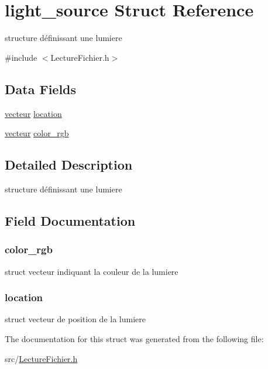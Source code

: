 \hypertarget{structlight__source}{
\section{light\_\-source Struct Reference}
\label{structlight__source}
}


structure définissant une lumiere  




{\ttfamily \#include $<$LectureFichier.h$>$}

\subsection*{Data Fields}
\begin{DoxyCompactItemize}
\item 
\hyperlink{structvecteur}{vecteur} \hyperlink{structlight__source_ae655d799d0a983ee8cf5fc840953c404}{location}
\item 
\hyperlink{structvecteur}{vecteur} \hyperlink{structlight__source_a9efa06c385522a41b30ea3767811650a}{color\_\-rgb}
\end{DoxyCompactItemize}


\subsection{Detailed Description}
structure définissant une lumiere 

\subsection{Field Documentation}
\hypertarget{structlight__source_a9efa06c385522a41b30ea3767811650a}{
\subsubsection[{color\_\-rgb}]{ {\bf color\_\-rgb}}}
\label{structlight__source_a9efa06c385522a41b30ea3767811650a}
struct vecteur indiquant la couleur de la lumiere \hypertarget{structlight__source_ae655d799d0a983ee8cf5fc840953c404}{
\subsubsection[{location}]{ {\bf location}}}
\label{structlight__source_ae655d799d0a983ee8cf5fc840953c404}
struct vecteur de position de la lumiere 

The documentation for this struct was generated from the following file:\begin{DoxyCompactItemize}
\item 
src/\hyperlink{_lecture_fichier_8h}{LectureFichier.h}\end{DoxyCompactItemize}
